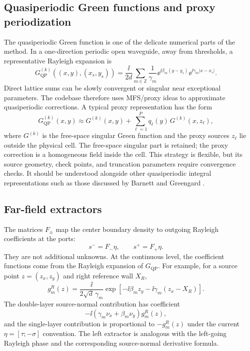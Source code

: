\subsection{Quasiperiodic Green functions and proxy periodization}

The quasiperiodic Green function is one of the delicate numerical parts of the
method.  In a one-direction periodic open waveguide, away from thresholds, a
representative Rayleigh expansion is
\[
  G_{\mathrm{QP}}^{(k)}((x,y),(x_s,y_s))
  =
  \frac{\ii}{2d}
  \sum_{m\in\mathbb Z}
  \frac{1}{\gamma_m}
  \ee^{\ii\beta_m(y-y_s)}
  \ee^{\ii\gamma_m|x-x_s|}.
\]
Direct lattice sums can be slowly convergent or singular near exceptional
parameters.  The codebase therefore uses MFS/proxy ideas to approximate
quasiperiodic corrections.  A typical proxy representation has the form
\[
  G_{\mathrm{QP}}^{(k)}(x,y)
  \approx
  G^{(k)}(x,y)
  +
  \sum_{\ell=1}^{P}q_\ell(y)\,G^{(k)}(x,z_\ell),
\]
where \(G^{(k)}\) is the free-space singular Green function and the proxy
sources \(z_\ell\) lie outside the physical cell.  The free-space singular part
is retained; the proxy correction is a homogeneous field inside the cell.  This
strategy is flexible, but its source geometry, check points, and truncation
parameters require convergence checks.  It should be understood alongside other
quasiperiodic integral representations such as those discussed by Barnett and
Greengard \cite{BarnettGreengard2010}.

\subsection{Far-field extractors}

The matrices \(F_\pm\) map the center boundary density to outgoing Rayleigh
coefficients at the ports:
\[
  s^- = F_-\eta,
  \qquad
  s^+ = F_+\eta .
\]
They are not additional unknowns.  At the continuous level, the coefficient
functions come from the Rayleigh expansion of \(G_{\mathrm{QP}}\).  For example,
for a source point \(z=(z_x,z_y)\) and right reference wall \(X_R\),
\[
  g_m^R(z)
  =
  \frac{\ii}{2\sqrt d\,\gamma_m}
  \exp[-\ii\beta_m z_y-\ii\gamma_m(z_x-X_R)] .
\]
The double-layer source-normal contribution has coefficient
\[
  -\ii(\gamma_m\nu_x+\beta_m\nu_y)g_m^R(z),
\]
and the single-layer contribution is proportional to \(-g_m^R(z)\) under the
current \(\eta=[\tau;-\sigma]\) convention.  The left extractor is analogous
with the left-going Rayleigh phase and the corresponding source-normal
derivative formula.

